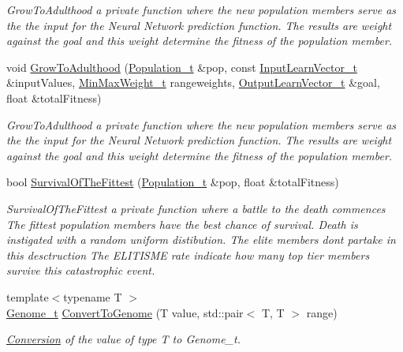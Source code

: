 \begin{DoxyCompactItemize}
\begin{DoxyCompactList}\small\item\em Grow\+To\+Adulthood a private function where the new population members serve as the the input for the Neural Network prediction function. The results are weight against the goal and this weight determine the fitness of the population member. \end{DoxyCompactList}\item 
void \hyperlink{class_soil_math_1_1_g_a_aa39c76b7958bfc80b713389a6f0c6b97}{Grow\+To\+Adulthood} (\hyperlink{_soil_math_types_8h_a8d2d4c736cf817d048a2d66dec8b12ec}{Population\+\_\+t} \&pop, const \hyperlink{_soil_math_types_8h_a45aa81992bf0ddf272907bd4fa0b96cf}{Input\+Learn\+Vector\+\_\+t} \&input\+Values, \hyperlink{_soil_math_types_8h_aaa919636507bcd52b19efa301aa80b9a}{Min\+Max\+Weight\+\_\+t} rangeweights, \hyperlink{_soil_math_types_8h_a2d8b5a261688166d724b68addd8561e6}{Output\+Learn\+Vector\+\_\+t} \&goal, float \&total\+Fitness)
\begin{DoxyCompactList}\small\item\em Grow\+To\+Adulthood a private function where the new population members serve as the the input for the Neural Network prediction function. The results are weight against the goal and this weight determine the fitness of the population member. \end{DoxyCompactList}\item 
bool \hyperlink{class_soil_math_1_1_g_a_ac2c10631815408d044738f678c67e98b}{Survival\+Of\+The\+Fittest} (\hyperlink{_soil_math_types_8h_a8d2d4c736cf817d048a2d66dec8b12ec}{Population\+\_\+t} \&pop, float \&total\+Fitness)
\begin{DoxyCompactList}\small\item\em Survival\+Of\+The\+Fittest a private function where a battle to the death commences The fittest population members have the best chance of survival. Death is instigated with a random uniform distibution. The elite members don\textquotesingle{}t partake in this desctruction The E\+L\+I\+T\+I\+S\+M\+E rate indicate how many top tier members survive this catastrophic event. \end{DoxyCompactList}\item 
{\footnotesize template$<$typename T $>$ }\\\hyperlink{_soil_math_types_8h_a58f6ab36d2cb0527a73caec36d14a0e0}{Genome\+\_\+t} \hyperlink{class_soil_math_1_1_g_a_a360250150f348af461259baf41477899}{Convert\+To\+Genome} (T value, std\+::pair$<$ T, T $>$ range)
\begin{DoxyCompactList}\small\item\em \hyperlink{class_conversion}{Conversion} of the value of type T to Genome\+\_\+t. \end{DoxyCompactList}\item 

\end{DoxyCompactItemize}

